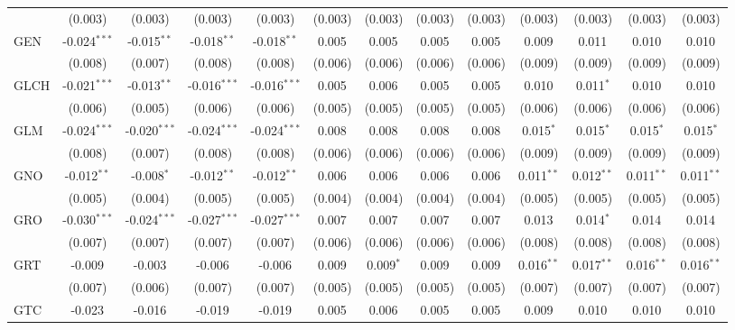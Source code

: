 \begin{table}[!htbp]
\begin{tabular}{@{\extracolsep{5pt}}lcccccccccccc}
  & (0.003) & (0.003) & (0.003) & (0.003) & (0.003) & (0.003) & (0.003) & (0.003) & (0.003) & (0.003) & (0.003) & (0.003) \\
 GEN & -0.024$^{***}$ & -0.015$^{**}$ & -0.018$^{**}$ & -0.018$^{**}$ & 0.005$^{}$ & 0.005$^{}$ & 0.005$^{}$ & 0.005$^{}$ & 0.009$^{}$ & 0.011$^{}$ & 0.010$^{}$ & 0.010$^{}$ \\
  & (0.008) & (0.007) & (0.008) & (0.008) & (0.006) & (0.006) & (0.006) & (0.006) & (0.009) & (0.009) & (0.009) & (0.009) \\
 GLCH & -0.021$^{***}$ & -0.013$^{**}$ & -0.016$^{***}$ & -0.016$^{***}$ & 0.005$^{}$ & 0.006$^{}$ & 0.005$^{}$ & 0.005$^{}$ & 0.010$^{}$ & 0.011$^{*}$ & 0.010$^{}$ & 0.010$^{}$ \\
  & (0.006) & (0.005) & (0.006) & (0.006) & (0.005) & (0.005) & (0.005) & (0.005) & (0.006) & (0.006) & (0.006) & (0.006) \\
 GLM & -0.024$^{***}$ & -0.020$^{***}$ & -0.024$^{***}$ & -0.024$^{***}$ & 0.008$^{}$ & 0.008$^{}$ & 0.008$^{}$ & 0.008$^{}$ & 0.015$^{*}$ & 0.015$^{*}$ & 0.015$^{*}$ & 0.015$^{*}$ \\
  & (0.008) & (0.007) & (0.008) & (0.008) & (0.006) & (0.006) & (0.006) & (0.006) & (0.009) & (0.009) & (0.009) & (0.009) \\
 GNO & -0.012$^{**}$ & -0.008$^{*}$ & -0.012$^{**}$ & -0.012$^{**}$ & 0.006$^{}$ & 0.006$^{}$ & 0.006$^{}$ & 0.006$^{}$ & 0.011$^{**}$ & 0.012$^{**}$ & 0.011$^{**}$ & 0.011$^{**}$ \\
  & (0.005) & (0.004) & (0.005) & (0.005) & (0.004) & (0.004) & (0.004) & (0.004) & (0.005) & (0.005) & (0.005) & (0.005) \\
 GRO & -0.030$^{***}$ & -0.024$^{***}$ & -0.027$^{***}$ & -0.027$^{***}$ & 0.007$^{}$ & 0.007$^{}$ & 0.007$^{}$ & 0.007$^{}$ & 0.013$^{}$ & 0.014$^{*}$ & 0.014$^{}$ & 0.014$^{}$ \\
  & (0.007) & (0.007) & (0.007) & (0.007) & (0.006) & (0.006) & (0.006) & (0.006) & (0.008) & (0.008) & (0.008) & (0.008) \\
 GRT & -0.009$^{}$ & -0.003$^{}$ & -0.006$^{}$ & -0.006$^{}$ & 0.009$^{}$ & 0.009$^{*}$ & 0.009$^{}$ & 0.009$^{}$ & 0.016$^{**}$ & 0.017$^{**}$ & 0.016$^{**}$ & 0.016$^{**}$ \\
  & (0.007) & (0.006) & (0.007) & (0.007) & (0.005) & (0.005) & (0.005) & (0.005) & (0.007) & (0.007) & (0.007) & (0.007) \\
 GTC & -0.023$^{}$ & -0.016$^{}$ & -0.019$^{}$ & -0.019$^{}$ & 0.005$^{}$ & 0.006$^{}$ & 0.005$^{}$ & 0.005$^{}$ & 0.009$^{}$ & 0.010$^{}$ & 0.010$^{}$ & 0.010$^{}$ \\

\end{tabular}
\end{table}
